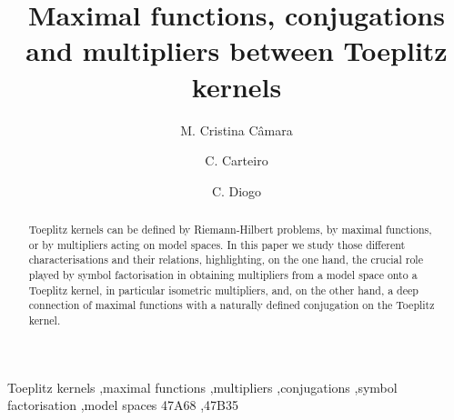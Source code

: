 \documentclass[12pt]{elsarticle}
\numberwithin{equation}{section}
\theoremstyle{plain}
\begin{document}
\begin{frontmatter}


 
\title{Maximal functions, conjugations and multipliers between Toeplitz kernels}


\author[a]{M. Cristina C\^{a}mara}

\author[a]{C. Carteiro}

\author[a,b]{C. Diogo}











\begin{abstract}
Toeplitz kernels can be defined by Riemann-Hilbert problems, by maximal functions, or by multipliers acting on model spaces.
In this paper we study those different characterisations and their relations, highlighting, on the one hand, the crucial role played by symbol factorisation in obtaining multipliers from a model space onto a Toeplitz kernel, in particular isometric multipliers, and, on the other hand, a deep connection of maximal functions with a naturally defined conjugation on the Toeplitz kernel.
\end{abstract}

\begin{keyword}
Toeplitz kernels \sep maximal functions \sep multipliers \sep conjugations \sep symbol factorisation \sep model spaces
\MSC[2020] 47A68 \sep 47B35
\end{keyword}


\end{frontmatter}
\end{document}
